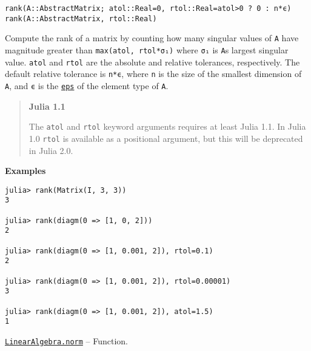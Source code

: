 \begin{adjustwidth}{2em}{0pt}


\begin{verbatim}
rank(A::AbstractMatrix; atol::Real=0, rtol::Real=atol>0 ? 0 : n*ϵ)
rank(A::AbstractMatrix, rtol::Real)
\end{verbatim}

Compute the rank of a matrix by counting how many singular values of \texttt{A} have magnitude greater than \texttt{max(atol, rtol*σ₁)} where \texttt{σ₁} is \texttt{A}{\textquotesingle}s largest singular value. \texttt{atol} and \texttt{rtol} are the absolute and relative tolerances, respectively. The default relative tolerance is \texttt{n*ϵ}, where \texttt{n} is the size of the smallest dimension of \texttt{A}, and \texttt{ϵ} is the \hyperlink{11007691776383983215}{\texttt{eps}} of the element type of \texttt{A}.

\begin{quote}
\textbf{Julia 1.1}

The \texttt{atol} and \texttt{rtol} keyword arguments requires at least Julia 1.1. In Julia 1.0 \texttt{rtol} is available as a positional argument, but this will be deprecated in Julia 2.0.

\end{quote}
\textbf{Examples}


\begin{verbatim}
julia> rank(Matrix(I, 3, 3))
3

julia> rank(diagm(0 => [1, 0, 2]))
2

julia> rank(diagm(0 => [1, 0.001, 2]), rtol=0.1)
2

julia> rank(diagm(0 => [1, 0.001, 2]), rtol=0.00001)
3

julia> rank(diagm(0 => [1, 0.001, 2]), atol=1.5)
1
\end{verbatim}



\end{adjustwidth}
\hypertarget{898926013064269707}{}
\hyperlink{898926013064269707}{\texttt{LinearAlgebra.norm}}  -- {Function.}

